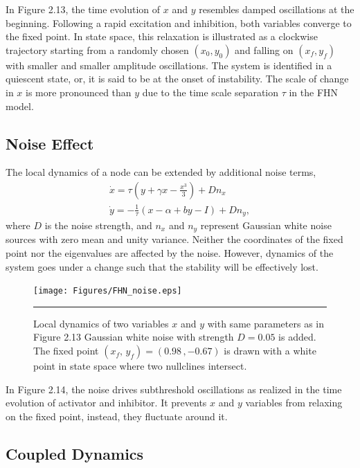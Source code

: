 In Figure 2.13, the time evolution of $x$ and $y$ resembles damped oscillations at the beginning. Following a rapid excitation and inhibition, both variables converge to the fixed point. In state space, this relaxation is illustrated as a clockwise trajectory starting from a randomly chosen $(x_0, y_0)$ and falling on $(x_f, y_f)$ with smaller and smaller amplitude oscillations. The system is identified in a  quiescent state, or, it is said to be at the onset of instability. The scale of change in $x$  is more pronounced than $y$ due to the time scale separation $\tau$ in the FHN model.  

\subsection{Noise Effect}
The local dynamics of a node can be extended by  additional noise terms, 
\begin{subequations}
\begin{align}\dot{x} = \tau \left( y + \gamma x - \frac{x^3}{3} \right) + Dn_x  \label{eqn: frobenius 12}\\  \dot{y} = -\frac{1}{\tau} (x - \alpha + b y - I ) + Dn_y , \label{eqn: frobenius 13}   \end{align} 
\end{subequations}
where $D$ is the noise strength, and $n_x$ and $n_y$ represent Gaussian white noise sources with zero mean and unity variance. Neither the coordinates of the fixed point nor the eigenvalues are affected by the noise. However, dynamics of the system goes under a change such that the stability will be effectively lost. 

\begin{figure}[htbp]
  \centering
	\texttt{[image: Figures/FHN\_noise.eps]}
 
    \rule{35em}{0.5pt}
    \caption[FHN Noise]{Local dynamics of two variables $x$ and $y$ with same parameters as in Figure 2.13 Gaussian white noise with strength $D=0.05$ is added. The fixed point $(x_f, \, y_f) = (0.98 \, , -0.67 )$ is drawn with a white point in state space where two nullclines intersect.  }
  \label{fig:FHN Noise}	
\end{figure}

In Figure 2.14, the noise drives subthreshold oscillations as realized in the time evolution of activator and inhibitor. It prevents $x$ and $y$ variables from relaxing on the fixed point, instead, they fluctuate around it.


\subsection{Coupled Dynamics}

